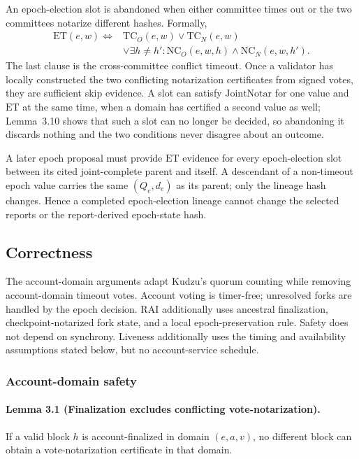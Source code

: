 \documentclass[10pt,twocolumn]{article}
\newcommand{\NC}{\mathrm{NC}}
\newcommand{\TC}{\mathrm{TC}}
\newcommand{\ET}{\mathrm{ET}}
\begin{document}
An epoch-election slot is abandoned when either committee times out or the two committees notarize different hashes. Formally,
\begin{align}
\ET(e,w) \Longleftrightarrow {}& \TC_O(e,w)\lor\TC_N(e,w)\\
&\lor\exists h\ne h':\NC_O(e,w,h)\wedge\NC_N(e,w,h').
\end{align}
The last clause is the cross-committee conflict timeout. Once a validator has locally constructed the two conflicting notarization certificates from signed votes, they are sufficient skip evidence. A slot can satisfy $\mathrm{JointNotar}$ for one value and $\ET$ at the same time, when a domain has certified a second value as well; Lemma~3.10 shows that such a slot can no longer be decided, so abandoning it discards nothing and the two conditions never disagree about an outcome.

A later epoch proposal must provide $\ET$ evidence for every epoch-election slot between its cited joint-complete parent and itself. A descendant of a non-timeout epoch value carries the same $(Q_e,d_e)$ as its parent; only the lineage hash changes. Hence a completed epoch-election lineage cannot change the selected reports or the report-derived epoch-state hash.

\subsection{Correctness}
The account-domain arguments adapt Kudzu's quorum counting while removing account-domain timeout votes. Account voting is timer-free; unresolved forks are handled by the epoch decision. RAI additionally uses ancestral finalization, checkpoint-notarized fork state, and a local epoch-preservation rule. Safety does not depend on synchrony. Liveness additionally uses the timing and availability assumptions stated below, but no account-service schedule.

\subsubsection{Account-domain safety}
\paragraph{Lemma 3.1 (Finalization excludes conflicting vote-notarization).} If a valid block $h$ is account-finalized in domain $(e,a,v)$, no different block can obtain a vote-notarization certificate in that domain.
\end{document}
